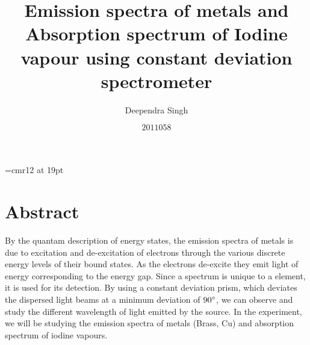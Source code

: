 \documentclass[9pt,a4paper]{article}
\begin{document}
\font\myfont=cmr12 at 19pt
\title{ { \textbf{ \myfont Emission spectra of metals and Absorption spectrum of Iodine vapour using constant deviation spectrometer }}}
\author{Deependra Singh}
\date{$2011058$}
\maketitle 
 \vspace*{0.5cm} 
\section{Abstract} 
By the quantam description of energy states, the emission spectra of metals is due to excitation and de-excitation of electrons through the various discrete energy levels of their bound states. As the electrons de-excite they emit light of energy corresponding to the energy gap. Since a spectrum is unique to a element, it is used for its detection. By using a constant deviation prism, which deviates the dispersed light beams at a minimum deviation of $90 \degree$, we can observe and study the different wavelength of light emitted by the source. In the experiment, we will be studying the emission spectra of metals (Brass, Cu) and absorption spectrum of iodine vapours.
\end{document}

